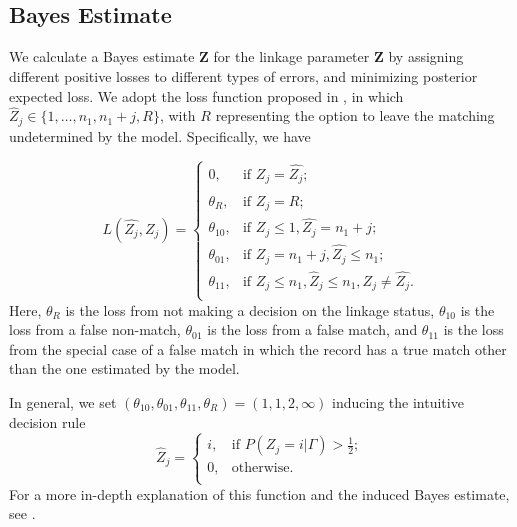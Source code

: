 \documentclass[ba]{imsart}
\begin{document}
\hypertarget{bayes-estimate}{%
	\subsection{Bayes Estimate}
	\label{bayes-estimate}}

We calculate a Bayes estimate \(\hat{\bm{Z}}\) for the linkage
parameter \(\bm{Z}\) by assigning different positive losses to
different types of errors, and minimizing posterior expected loss. We
adopt the loss function proposed in \cite{sadinle_bayesian_2017}, in which
\(\hat{Z}_j \in \{1, \ldots, n_1, n_1 + j, R\}\), with \(R\) representing the
option to leave the matching undetermined by the model. Specifically, we have

\[L(\hat{Z_j}, Z_j)=\begin{cases} 
	0,  & \text{if } Z_j = \hat{Z_j}; \\
	\theta_R,  & \text{if } \hat{Z_j} = R; \\
	\theta_{10},  & \text{if } Z_j \leq 1,\hat{Z_j} = n_1 + j ; \\
	\theta_{01},  & \text{if } Z_j = n_1 + j,\hat{Z_j} \leq n_1 ; \\
	\theta_{11},  & \text{if } Z_j \leq n_1, \hat{Z}_j \leq n_1, Z_j \neq \hat{Z_j}. \\
\end{cases}\] 
Here, \(\theta_R\) is the loss from not making a decision on the linkage status, \(\theta_{10}\) is the loss from a false non-match, \(\theta_{01}\) is the loss from a false match, and \(\theta_{11}\) is the loss from the special case of a false match in which the record has a true match other than the one estimated by the model. 


In general, we set $(\theta_{10}, \theta_{01}, \theta_{11}, \theta_R) = (1, 1, 2, \infty)$ inducing the intuitive decision rule
$$\hat{Z}_j =\begin{cases} 
	i,  & \text{if } P(Z_j = i |\Gamma) > \frac{1}{2}; \\
	0,  & \text{otherwise}. \\
\end{cases}$$
For a more in-depth explanation of this function and the induced Bayes
estimate, see \cite{sadinle_bayesian_2017}.
\end{document}
